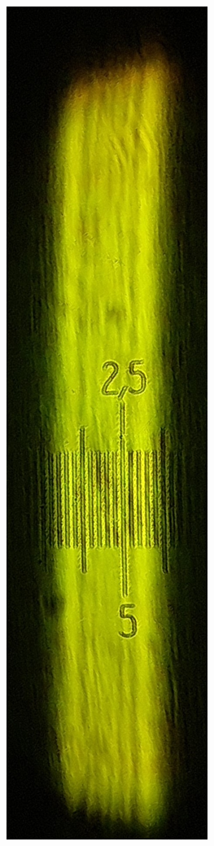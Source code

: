 \documentclass[14pt, a4paper]{report}
\begin{document}
\begin{enumerate}
\begin{figure}[H]
\begin{minipage}{.33\textwidth}
\end{minipage}%
\begin{minipage}{.33\textwidth}
  \centering
  \includegraphics[width=.6\linewidth]{../images/431m_4}
\end{minipage}
\end{figure}


\end{enumerate}
\end{document}
